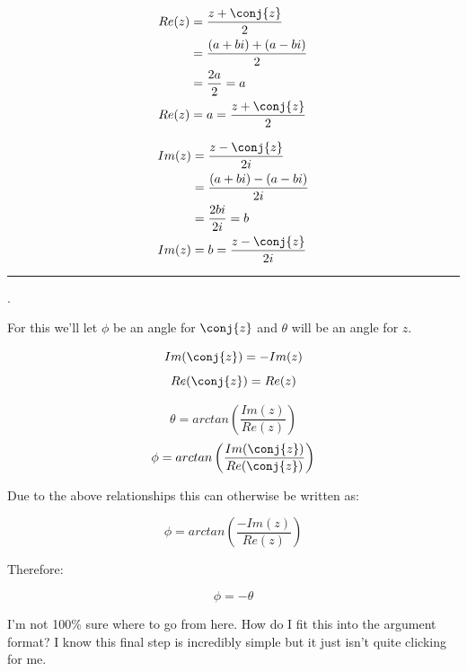 \begin{solution}[(c) Show that $Re(z) = \frac{z + \conj{z}}{2}$ and $Im(z) = \frac{z - \conj{z}}{2i}$]
    \begin{align}
        Re(z) &= \frac{z + \conj{z}}{2} \\
        &= \frac{(a+bi) + (a - bi)}{2} \\
        &= \frac{2a}{2} = a \\
        Re(z) &= a = \frac{z + \conj{z}}{2} 
    \end{align}
    
    \pagebreak 
    
    \begin{align}
        Im(z) &= \frac{z - \conj{z}}{2i} \\
        &= \frac{(a+bi) - (a - bi)}{2i} \\
        &= \frac{2bi}{2i} = b \\
        Im(z) &= b = \frac{z - \conj{z}}{2i} 
    \end{align}
\end{solution}

\hrule \medskip 

\begin{solution}
    . \linebreak 
    
    For this we'll let $\phi$ be an angle for $\conj{z}$ and $\theta$ will be an angle for $z$.
    
    \[Im(\conj{z}) = -Im(z)\]
    \[Re(\conj{z}) = Re(z)\]
    
    \[\theta = arctan \left( \frac{Im(z)}{Re(z)} \right) \]
    \[ \phi = arctan \left( \frac{Im(\conj{z})}{Re(\conj{z})} \right) \] 
    
    Due to the above relationships this can otherwise be written as:
    
    \[ \phi = arctan \left( \frac{-Im(z)}{Re(z)} \right) \]
    
    Therefore: 
    
    \[\phi = -\theta\]
    
    I'm not 100\% sure where to go from here. How do I fit this into the argument format? I know this final step is incredibly simple but it just isn't quite clicking for me. 
\end{solution}